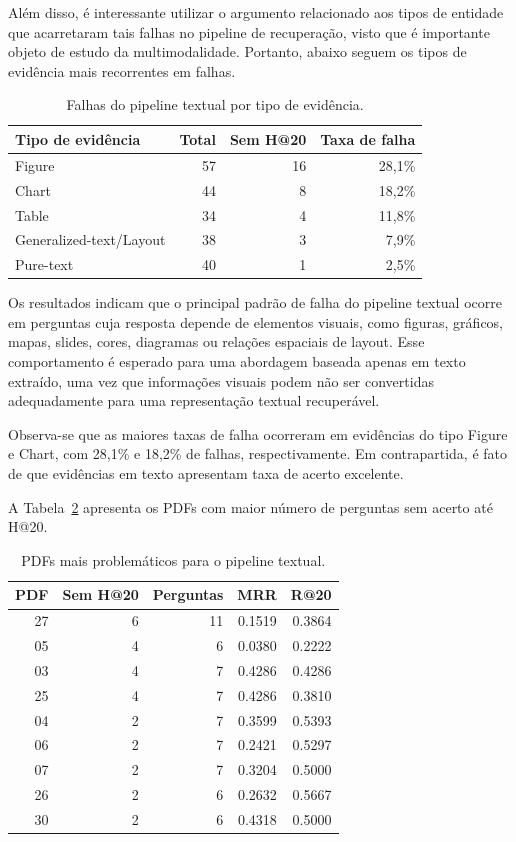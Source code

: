 Além disso, é interessante utilizar o argumento relacionado aos tipos de entidade que acarretaram tais falhas no pipeline de recuperação, visto que é importante objeto de estudo da multimodalidade. Portanto, abaixo seguem os tipos de evidência mais recorrentes em falhas.


\begin{table}[htbp]
\centering
\caption{Falhas do pipeline textual por tipo de evidência.}
\label{tab:falhas-tipo-evidencia}
\small
\begin{tabular}{lrrr}
\toprule
\textbf{Tipo de evidência} & \textbf{Total} & \textbf{Sem H@20} & \textbf{Taxa de falha} \\
\midrule
Figure & 57 & 16 & 28,1\% \\
Chart & 44 & 8 & 18,2\% \\
Table & 34 & 4 & 11,8\% \\
Generalized-text/Layout & 38 & 3 & 7,9\% \\
Pure-text & 40 & 1 & 2,5\% \\
\bottomrule
\end{tabular}
\end{table}

Os resultados indicam que o principal padrão de falha do pipeline textual ocorre em perguntas cuja resposta depende de elementos visuais, como figuras, gráficos, mapas, slides, cores, diagramas ou relações espaciais de layout. Esse comportamento é esperado para uma abordagem baseada apenas em texto extraído, uma vez que informações visuais podem não ser convertidas adequadamente para uma representação textual recuperável.

Observa-se que as maiores taxas de falha ocorreram em evidências do tipo Figure e Chart, com 28,1\% e 18,2\% de falhas, respectivamente. Em contrapartida, é fato de que evidências em texto apresentam taxa de acerto excelente.

A Tabela~\ref{tab:pdfs-problematicos-textual} apresenta os PDFs com maior número de perguntas sem acerto até H@20.

\begin{table}[htbp]
\centering
\caption{PDFs mais problemáticos para o pipeline textual.}
\label{tab:pdfs-problematicos-textual}
\small
\begin{tabular}{r r r r r}
\toprule
\textbf{PDF} & \textbf{Sem H@20} & \textbf{Perguntas} & \textbf{MRR} & \textbf{R@20} \\
\midrule
27 & 6 & 11 & 0.1519 & 0.3864 \\
05 & 4 & 6 & 0.0380 & 0.2222 \\
03 & 4 & 7 & 0.4286 & 0.4286 \\
25 & 4 & 7 & 0.4286 & 0.3810 \\
04 & 2 & 7 & 0.3599 & 0.5393 \\
06 & 2 & 7 & 0.2421 & 0.5297 \\
07 & 2 & 7 & 0.3204 & 0.5000 \\
26 & 2 & 6 & 0.2632 & 0.5667 \\
30 & 2 & 6 & 0.4318 & 0.5000 \\
\bottomrule
\end{tabular}
\end{table}


